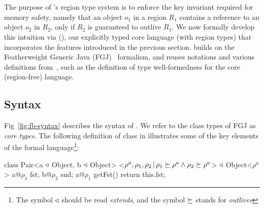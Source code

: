 \section{\fbname}
\label{sec:type-system}

The purpose of \name's region type system is to enforce the key
invariant required for memory safety, namely that an object $o_1$ in a
region $R_1$ contains a reference to an object $o_2$ in $R_2$, only if
$R_2$ is guaranteed to outlive $R_1$. 
We now formally develop this intuition via \fbname (\FB), our
explicitly typed core language (with region types) that incorporates
the features introduced in the previous section. \fbname builds on the
Featherweight Generic Java (FGJ)~\cite{fgj} formalism, and reuses
notations and various definitions from~\cite{fgj}, such as the
definition of type well-formedness for the core (region-free)
language. 


\subsection{Syntax}
\label{sec:fb-syntax}

Fig~\ref{fig:fb-syntax} describes the syntax of \FB.
We refer to the class types of FGJ as \emph{core types}.
%
The following definition of  class in \FB illustrates some
of the key elements of the formal language\footnote{The symbol
$\triangleleft$ should be read \emph{extends}, and the symbol $\succeq$
stands for \emph{outlives}}:
\begin{codejava}[mathescape=true]
class Pair<a $\triangleleft$ Object, b $\triangleleft$ Object>
          <$\rho^a, \rho_1, \rho_2 \,|\, \rho_1 \succeq \rho^a \wedge \rho_2 \succeq \rho^a$> $\triangleleft$ Object<$\rho^a$> {
  a@$\rho_1$ fst; 
  b@$\rho_2$ snd;
  a@$\rho_1$ getFst() { 
    return this.fst; 
  }
}
\end{codejava}


